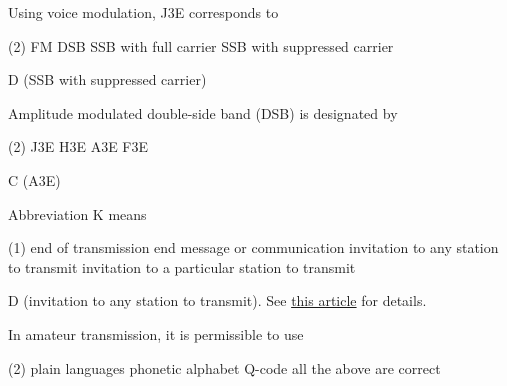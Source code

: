 \documentclass[a4paper]{article}
\begin{document}
\begin{question}Using voice modulation, J3E corresponds to
	\begin{tasks}(2)
		\task FM
		\task DSB
		\task SSB with full carrier
		\task SSB with suppressed carrier
	\end{tasks}
\end{question}

\begin{solution}
	D (SSB with suppressed carrier)
\end{solution}

\vspace{5mm}



\begin{question}Amplitude modulated double-side band (DSB) is designated by
	\begin{tasks}(2)
		\task J3E
		\task H3E
		\task A3E
		\task F3E
	\end{tasks}
\end{question}

\begin{solution}
	C (A3E)
\end{solution}

\vspace{5mm}


\begin{question}Abbreviation \apostrophe{}K\apostrophe{} means
	\begin{tasks}(1)
		\task end of transmission
		\task end message or communication
		\task invitation to any station to transmit
		\task invitation to a particular station to transmit
	\end{tasks}
\end{question}

\begin{solution}
	D (invitation to any station to transmit). See \href{https://en.wikipedia.org/wiki/Prosigns_for_Morse_code}{this article} for details.
\end{solution}

\vspace{5mm}



\begin{question}In amateur transmission, it is permissible to use
	\begin{tasks}(2)
		\task plain languages
		\task phonetic alphabet
		\task Q-code
		\task all the above are correct
	\end{tasks}
\end{question}
\end{document}
